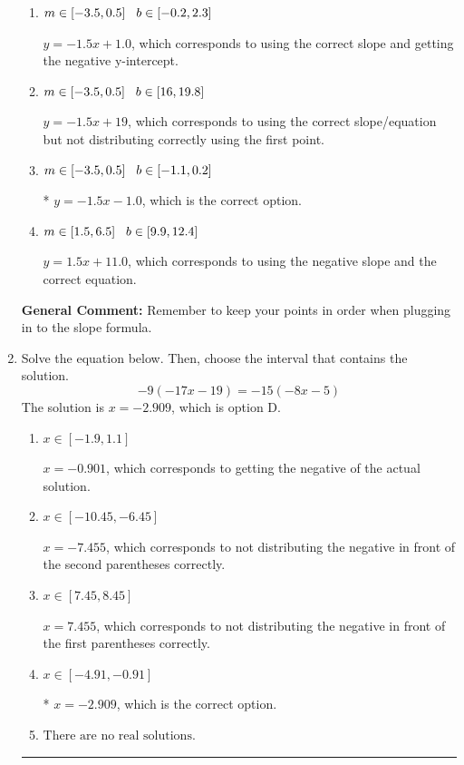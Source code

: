 \documentclass{extbook}[14pt]
\newcommand{\litem}[1]{\item #1

\rule{\textwidth}{0.4pt}}
\begin{document}
\begin{enumerate}
{\begin{enumerate}[label=\Alph*.]
 $y = -1.5x + 9$, which corresponds to using the correct slope/equation but not distributing correctly using the second point.
\item \( m \in [-3.5, 0.5] \hspace*{3mm} b \in [-0.2, 2.3] \)

 $y = -1.5x + 1.0$, which corresponds to using the correct slope and getting the negative y-intercept.
\item \( m \in [-3.5, 0.5] \hspace*{3mm} b \in [16, 19.8] \)

 $y = -1.5x + 19$, which corresponds to using the correct slope/equation but not distributing correctly using the first point.
\item \( m \in [-3.5, 0.5] \hspace*{3mm} b \in [-1.1, 0.2] \)

* $y = -1.5x -1.0$, which is the correct option.
\item \( m \in [1.5, 6.5] \hspace*{3mm} b \in [9.9, 12.4] \)

 $y = 1.5x + 11.0$, which corresponds to using the negative slope and the correct equation.
\end{enumerate}

\textbf{General Comment:} Remember to keep your points in order when plugging in to the slope formula.
}
\litem{
Solve the equation below. Then, choose the interval that contains the solution.
\[ -9(-17x -19) = -15(-8x -5) \]
The solution is \( x = -2.909 \), which is option D.\begin{enumerate}[label=\Alph*.]
\item \( x \in [-1.9, 1.1] \)

$x = -0.901$, which corresponds to getting the negative of the actual solution.
\item \( x \in [-10.45, -6.45] \)

$x = -7.455$, which corresponds to not distributing the negative in front of the second parentheses correctly.
\item \( x \in [7.45, 8.45] \)

$x = 7.455$, which corresponds to not distributing the negative in front of the first parentheses correctly.
\item \( x \in [-4.91, -0.91] \)

* $x = -2.909$, which is the correct option.
\item \( \text{There are no real solutions.} \)


\end{enumerate}}
\end{enumerate}
\end{document}
